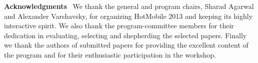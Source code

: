 \newcommand{\ackpara}[1]{\vspace{9pt}\noindent\textbf{#1}\ }
\ackpara{Acknowledgments}
We thank the general and program chairs, Sharad Agarwal and Alexander
Varshavsky, for organizing HotMobile 2013 and keeping its
highly interactive spirit. We also thank the program-committee members
for their dedication in evaluating, selecting and shepherding the
selected papers. Finally we thank the authors of submitted papers for
providing the excellent content of the program and for their
enthusiastic participation in the workshop.
